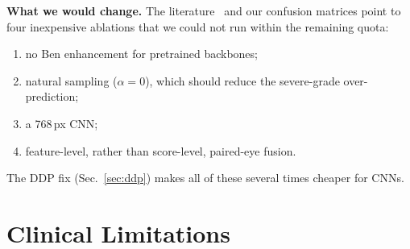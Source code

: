 \documentclass[conference,a4paper]{IEEEtran}
\begin{document}
\textbf{What we would change.}
The literature~\cite{huang} and our confusion matrices point to four inexpensive ablations that we could not run within the remaining quota:
\begin{enumerate}
\item no Ben enhancement for pretrained backbones;
\item natural sampling ($\alpha=0$), which should reduce the severe-grade over-prediction;
\item a 768\,px CNN;
\item feature-level, rather than score-level, paired-eye fusion.
\end{enumerate}
The DDP fix (Sec.~\ref{sec:ddp}) makes all of these several times cheaper for CNNs.

\section{Clinical Limitations}\label{sec:limits}
\end{document}

